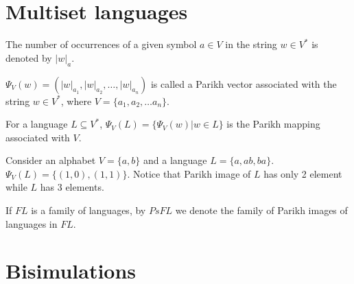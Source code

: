 
\section{Multiset languages} %
\label{sec:multiset_languages}

The number of occurrences of a given symbol $a\in V$ in the string $w\in V^*$ is denoted by $|w|_a$.

\begin{definition}
$\Psi_V(w)=(|w|_{a_1},|w|_{a_2},\ldots,|w|_{a_n})$ is called a Parikh vector associated with the string $w\in V^*$, where $V=\{a_1,a_2,\ldots a_n\}$.
\end{definition}

\begin{definition}
For a language $L\subseteq V^*$, $\Psi_V(L)=\{\Psi_V(w)|w\in L\}$ is the Parikh mapping associated with $V$.
\end{definition}

\begin{example}
Consider an alphabet $V=\{a,b\}$ and a language $L=\{a, ab, ba\}$.
$\Psi_V(L)=\{(1,0), (1,1)\}$. Notice that Parikh image of $L$ has only 2 element while $L$ has 3 elements.
\end{example}

\begin{definition}
If $FL$ is a family of languages, by $PsFL$ we denote the family of Parikh images of languages in $FL$.
\end{definition}


\section{Bisimulations} %
\label{sec:bisimulations}


